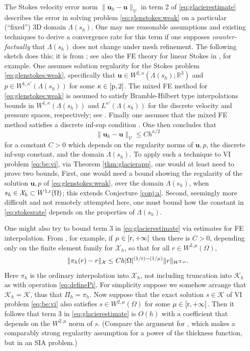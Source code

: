 \documentclass[hidelinks,onefignum,onetabnum,final]{siamart220329}  %
\newcommand{\RR}{\mathbb{R}}
\newcommand{\bu}{\mathbf{u}}
\newcommand{\cK}{\mathcal{K}}
\newcommand{\cV}{\mathcal{V}}
\newcommand{\cX}{\mathcal{X}}
\newcommand{\pp}{{\text{\textnormal{p}}}}
\newcommand{\rr}{{\text{\textnormal{r}}}}
\begin{document}
The Stokes velocity error norm $\|\bu_h - \bu\|_{\cV}$ in term 2 of \eqref{eq:glacierestimate} describes the error in solving problem \eqref{eq:glenstokes:weak} on a particular (``fixed'') 3D domain $\Lambda(s_h)$.  One may use reasonable assumptions and existing techniques to derive a convergence rate for this term if one supposes \emph{counter-factually} that $\Lambda(s_h)$ does not change under mesh refinement.  The following sketch does this; it is from \cite[Theorem 4.9]{JouvetRappaz2011}; see also the FE theory for linear Stokes in \cite{Elmanetal2014}, for example.  One assumes solution regularity for the Stokes problem \eqref{eq:glenstokes:weak}, specifically that $\bu\in W^{2,\kappa}(\Lambda(s_h);\RR^3)$ and $p \in W^{1,\kappa'}(\Lambda(s_h))$ for some $\kappa \in [\pp,2]$.  The mixed FE method for \eqref{eq:glenstokes:weak} is assumed to satisfy Bramble-Hilbert type interpolations bounds in $W^{1,\kappa}(\Lambda(s_h))$ and $L^{\kappa'}(\Lambda(s_h))$ for the discrete velocity and pressure spaces, respectively; see \cite[inequalities (4.26), (4.27)]{JouvetRappaz2011}.  Finally one assumes that the mixed FE method satisfies a discrete inf-sup condition \cite[equation (4.1)]{JouvetRappaz2011}.  One then concludes that
\begin{equation}
\|\bu_h - \bu\|_{\cV} \le C h^{\kappa/2}
\label{eq:stokesrate}
\end{equation}
for a constant $C>0$ which depends on the regularity norms of $\bu,p$, the discrete inf-sup constant, and the domain $\Lambda(s_h)$.  To apply such a technique to VI problem \eqref{eq:be:vi}, via Theorem \ref{thm:glacierapp}, one would at least need to prove two bounds,  First, one would need a bound showing the regularity of the solution $\bu,p$ of \eqref{eq:glenstokes:weak}, over the domain $\Lambda(s_h)$, when $s_h \in \cX_h \subset W^{1,\rr}(\Omega)$; this extends Conjecture \ref{conj:a}.  Second, seemingly more difficult and not remotely attempted here, one must bound how the constant in \eqref{eq:stokesrate} depends on the properties of $\Lambda(s_h)$.

One might also try to bound term 3 in \eqref{eq:glacierestimate} via estimates for FE interpolation.  From \cite[Theorem 3.1.6]{Ciarlet2002}, for example, if $\mu \in [\rr,+\infty]$ then there is $C>0$, depending only on the finite element family for $\cX_h$, so that for all $r \in W^{2,\mu}(\Omega)$,
\begin{equation}
\|\pi_h(r) - r\|_{\cX} \le C h |\Omega|^{(1/\rr)-(1/\mu)} \|r\|_{W^{2,\mu}}. \label{eq:ciarletregularity}
\end{equation}
Here $\pi_h$ is the ordinary interpolation into $\cX_h$, not including truncation into $\cK_h$ as with operation \eqref{eq:definePi}.  For simplicity suppose we somehow arrange that $\cK_h=\cK$, thus that $\Pi_h=\pi_h$.  Now suppose that the exact solution $s\in\cK$ of VI problem \eqref{eq:be:vi} also satisfies $s\in W^{2,\mu}(\Omega)$ for some $\mu \in [\rr,+\infty]$.  Then it follows that term 3 in \eqref{eq:glacierestimate} is $O(h)$ with a coefficient that depends on the $W^{2,\mu}$ norm of $s$.  (Compare the argument for \cite[Theorem 4.3]{JouvetBueler2012}, which makes a comparably strong regularity assumption for a power of the thickness function, but in an SIA problem.)
\end{document}
